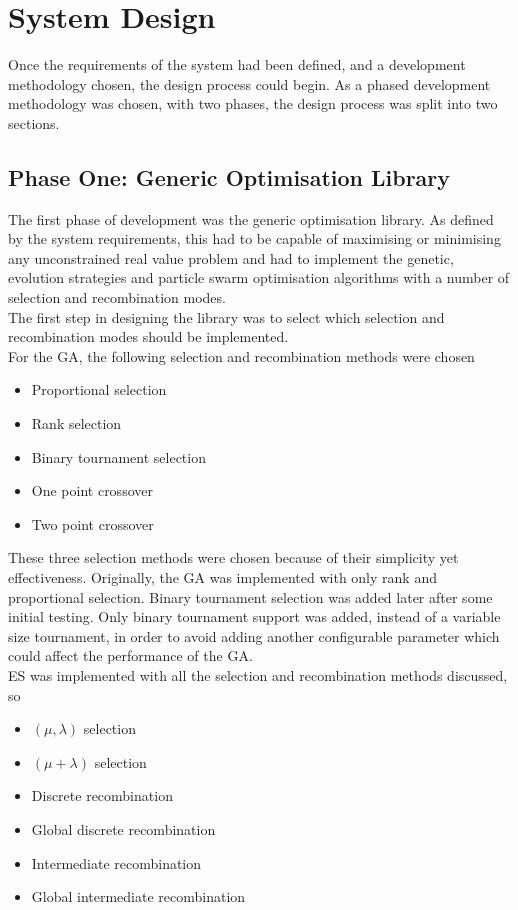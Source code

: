 \chapter{System Design}
Once the requirements of the system had been defined, and a development methodology chosen, the design process could begin. As a phased development methodology was chosen, with two phases, the design process was split into two sections.

\section{Phase One: Generic Optimisation Library}
The first phase of development was the generic optimisation library. As defined by the system requirements, this had to be capable of maximising or minimising any unconstrained real value problem and had to implement the genetic, evolution strategies and particle swarm optimisation algorithms with a number of selection and recombination modes.
\\The first step in designing the library was to select which selection and recombination modes should be implemented. 
\\For the GA, the following selection and recombination methods were chosen
\begin{itemize}
  \item{Proportional selection}
  \item{Rank selection}
  \item{Binary tournament selection}
  \item{One point crossover}
  \item{Two point crossover}
\end{itemize}
These three selection methods were chosen because of their simplicity yet effectiveness. Originally, the GA was implemented with only rank and proportional selection. Binary tournament selection was added later after some initial testing. Only binary tournament support was added, instead of a variable size tournament, in order to avoid adding another configurable parameter which could affect the performance of the GA.
\\ES was implemented with all the selection and recombination methods discussed, so
\begin{itemize}
  \item{$(\mu,\lambda)$ selection}
  \item{$(\mu+\lambda)$ selection}
  \item{Discrete recombination}
  \item{Global discrete recombination}
  \item{Intermediate recombination}
  \item{Global intermediate recombination}
\end{itemize}
